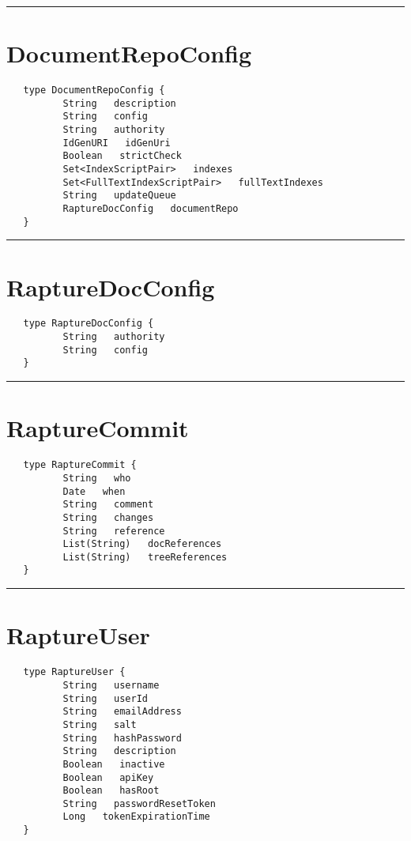 \rule{15cm}{2pt}
\section{DocumentRepoConfig}
\label{type:DocumentRepoConfig}

\begin{verbatim}
   type DocumentRepoConfig {
          String   description
          String   config
          String   authority
          IdGenURI   idGenUri
          Boolean   strictCheck
          Set<IndexScriptPair>   indexes
          Set<FullTextIndexScriptPair>   fullTextIndexes
          String   updateQueue
          RaptureDocConfig   documentRepo
   }
\end{verbatim}

\rule{15cm}{2pt}
\section{RaptureDocConfig}
\label{type:RaptureDocConfig}

\begin{verbatim}
   type RaptureDocConfig {
          String   authority
          String   config
   }
\end{verbatim}

\rule{15cm}{2pt}
\section{RaptureCommit}
\label{type:RaptureCommit}

\begin{verbatim}
   type RaptureCommit {
          String   who
          Date   when
          String   comment
          String   changes
          String   reference
          List(String)   docReferences
          List(String)   treeReferences
   }
\end{verbatim}

\rule{15cm}{2pt}
\section{RaptureUser}
\label{type:RaptureUser}

\begin{verbatim}
   type RaptureUser {
          String   username
          String   userId
          String   emailAddress
          String   salt
          String   hashPassword
          String   description
          Boolean   inactive
          Boolean   apiKey
          Boolean   hasRoot
          String   passwordResetToken
          Long   tokenExpirationTime
   }
\end{verbatim}


